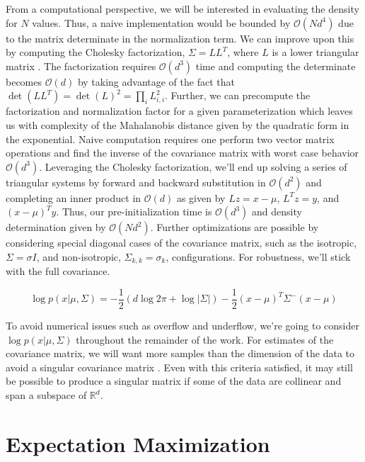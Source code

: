 \documentclass{article}
\newcommand{\boundedBy}[1]{\mathcal{O} \left ( #1 \right )}
\begin{document}
From a computational perspective, we will be interested in evaluating the density for $N$ values. Thus, a naive implementation would be bounded by $\boundedBy{N d^4}$ due to the matrix determinate in the normalization term. We can improve upon this by computing the Cholesky factorization, $\Sigma = L L^T$, where $L$ is a lower triangular matrix \cite[157-158]{kincaid2002}. The factorization requires $\boundedBy{d^3}$ time and computing the determinate becomes $\boundedBy{d}$ by taking advantage of the fact that $\det\left(L L^T\right) = \det(L)^2 = \prod_i L_{i,i}^2$. Further, we can precompute the factorization and normalization factor for a given parameterization which leaves us with complexity of the Mahalanobis distance given by the quadratic form in the exponential. Naive computation requires one perform two vector matrix operations and find the inverse of the covariance matrix with worst case behavior $\boundedBy{d^3}$. Leveraging the Cholesky factorization, we'll end up solving a series of triangular systems by forward and backward substitution in $\boundedBy{d^2}$ and completing an inner product in $\boundedBy{d}$ as given by $L z = x - \mu$, $L^T z = y$, and $(x-\mu)^T y$. Thus, our pre-initialization time is $\boundedBy{d^3}$ and density determination given by $\boundedBy{N d^2}$. Further optimizations are possible by considering special diagonal cases of the covariance matrix, such as the isotropic, $\Sigma = \sigma I$, and non-isotropic, $\Sigma_{k,k} = \sigma_k$, configurations. For robustness, we'll stick with the full covariance.

\begin{equation}
	\log p( x \lvert \mu, \Sigma ) = - \frac{1}{2} \left( d \log 2\pi + \log \lvert \Sigma \rvert \right ) - \frac{1}{2} (x - \mu)^{T} \Sigma^{-} (x - \mu)
\end{equation}

To avoid numerical issues such as overflow and underflow, we're going to consider $\log p(x \lvert \mu, \Sigma)$ throughout the remainder of the work. For estimates of the covariance matrix, we will want more samples than the dimension of the data to avoid a singular covariance matrix \cite{fan2016overview}. Even with this criteria satisfied, it may still be possible to produce a singular matrix if some of the data are collinear and span a subspace of $\mathbb{R}^d$.

\section{Expectation Maximization}
\end{document}
